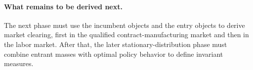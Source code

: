 \paragraph{What remains to be derived next.}
The next phase must use the incumbent objects and the entry objects to derive market clearing, first in the qualified contract-manufacturing market and then in the labor market. After that, the later stationary-distribution phase must combine entrant masses with optimal policy behavior to define invariant measures.
